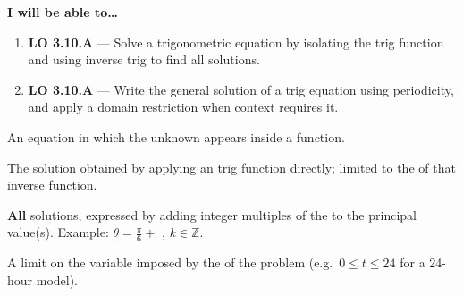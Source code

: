 \documentclass[10pt]{article}
\begin{document}
\namedateperiod

\vspace{0.08in}

\begin{objectivebox}
\textbf{I will be able to\ldots}
\begin{enumerate}[leftmargin=1.5em, itemsep=4pt]
  \item \textbf{LO 3.10.A} --- Solve a trigonometric equation by isolating
    the trig function and using inverse trig to find all solutions.
  \item \textbf{LO 3.10.A} --- Write the general solution of a trig equation
    using periodicity, and apply a domain restriction when context requires it.
\end{enumerate}
\end{objectivebox}

\vspace{0.06in}

\begin{vocabbox}
\begin{description}[leftmargin=0pt, itemsep=5pt]
  \item[\termblanklong{trigonometric equation}]
    An equation in which the unknown appears inside a
     function.

  \item[\termblanklong{principal solution}]
    The solution obtained by applying an  trig function
    directly; limited to the  of that inverse function.

  \item[\termblanklong{general solution}]
    \textbf{All} solutions, expressed by adding integer multiples of the
     to the principal value(s).
    Example: $\theta = \tfrac{\pi}{6} + $ ,
    $k \in \mathbb{Z}$.

  \item[\termblanklong{domain restriction}]
    A limit on the variable imposed by the  of the
    problem (e.g.\ $0 \le t \le 24$ for a 24-hour model).
\end{description}
\end{vocabbox}
\end{document}

